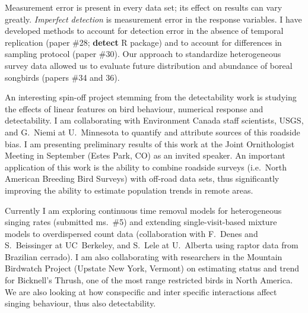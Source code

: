 Measurement error is present in every data set; its effect on results can vary greatly. \emph{Imperfect detection} is measurement error in the response variables. I have developed methods to account for detection error in the absence of temporal replication (paper \#28; \textbf{detect} R package) and to account for differences in sampling protocol (paper \#30). 
Our approach to standardize heterogeneous survey data allowed us to evaluate future distribution and abundance of boreal songbirds (papers \#34 and 36).
\vspace{0.5pc}

An interesting spin-off project stemming from the detectability work is studying the effects of linear features on bird behaviour, numerical response and detectability. I am collaborating with Environment Canada staff scientists, USGS, and G.~Niemi at U.~Minnesota to quantify and attribute sources of this roadside bias. I am presenting preliminary results of this work at the Joint Ornithologist Meeting in September (Estes Park, CO) as an invited speaker. An important application of this work is the ability to combine roadside surveys (i.e.~North American Breeding Bird Surveys) with off-road data sets, thus significantly improving the ability to estimate population trends in remote areas.
\vspace{0.5pc}

Currently I am exploring continuous time removal models for heterogeneous singing rates (submitted ms.~\#5) and extending single-visit-based mixture models to overdispersed count data (collaboration with F.~Denes and S.~Beissinger at UC~Berkeley, and S.~Lele at U.~Alberta using raptor data from Brazilian cerrado). I am also collaborating with researchers in the Mountain Birdwatch Project (Upstate New York, Vermont) on estimating status and trend for Bicknell's Thrush, one of the most range restricted birds in North America. We are also looking at how conspecific and inter specific interactions affect singing behaviour, thus also detectability.
\vspace{0.5pc}

